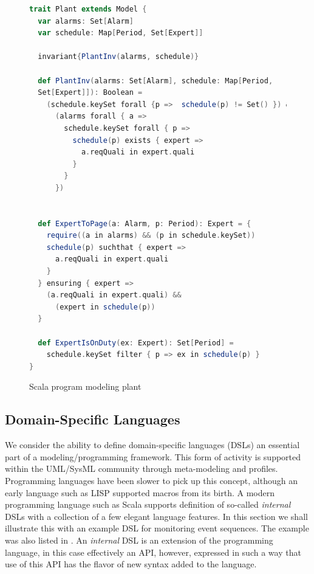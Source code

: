 \begin{figure}
\begin{lstlisting}[language=scala,frame=single]
trait Plant extends Model {
  var alarms: Set[Alarm]
  var schedule: Map[Period, Set[Expert]]

  invariant{PlantInv(alarms, schedule)}

  def PlantInv(alarms: Set[Alarm], schedule: Map[Period, 
  Set[Expert]]): Boolean =
    (schedule.keySet forall {p =>  schedule(p) != Set() }) &&
      (alarms forall { a =>
        schedule.keySet forall { p =>
          schedule(p) exists { expert =>
            a.reqQuali in expert.quali
          }
        }
      })


  def ExpertToPage(a: Alarm, p: Period): Expert = {
    require((a in alarms) && (p in schedule.keySet))
    schedule(p) suchthat { expert =>
      a.reqQuali in expert.quali
    }
  } ensuring { expert =>
    (a.reqQuali in expert.quali) &&
      (expert in schedule(p))
  }

  def ExpertIsOnDuty(ex: Expert): Set[Period] =
    schedule.keySet filter { p => ex in schedule(p) }
}
\end{lstlisting}
\caption{Scala program modeling plant}
\label{fig:plant-scala}
\end{figure}

\subsection{Domain-Specific Languages}
\label{sec:dsl-in-scala}

We consider the ability to define domain-specific languages (DSLs) 
an essential part of a modeling/programming framework. This form of 
activity is supported 
within the UML/SysML community through meta-modeling and profiles. 
Programming languages have been slower to pick up this concept, 
although an early language such as LISP supported macros
from its birth. A modern programming language such as Scala 
supports definition of
so-called {\em internal} DSLs with a collection of a few 
elegant language features. In this section we shall illustrate this 
with an example
DSL for monitoring event sequences. 
The example was also listed in \cite{havelund-joshi-experience-2014}.
An {\em internal} DSL is an extension of the programming language, 
in this case 
effectively an API, however, expressed in such a way that use of 
this API
has the flavor of new syntax added to the language.


